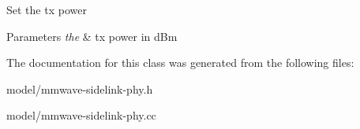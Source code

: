 Set the tx power 
\begin{DoxyParams}{Parameters}
{\em the} & tx power in d\+Bm \\
\hline
\end{DoxyParams}


The documentation for this class was generated from the following files\+:\begin{DoxyCompactItemize}
\item 
model/mmwave-\/sidelink-\/phy.\+h\item 
model/mmwave-\/sidelink-\/phy.\+cc\end{DoxyCompactItemize}
